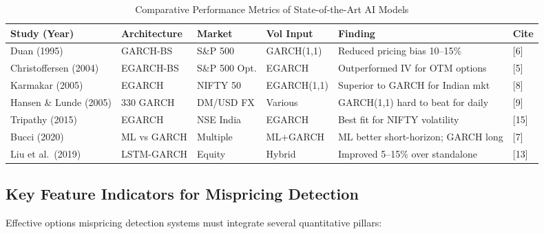 \documentclass[12pt,a4paper]{article}
\begin{document}
\begin{table}[H]
\centering
\caption{Comparative Performance Metrics of State-of-the-Art AI Models}
\label{tab:model_comparison}
\small
\begin{tabularx}{\textwidth}{l l l l X l}
\toprule
\textbf{Study (Year)} & \textbf{Architecture} & \textbf{Market} & \textbf{Vol Input} & \textbf{Finding} & \textbf{Cite} \\
\midrule
Duan (1995) & GARCH-BS & S\&P 500 & GARCH(1,1) & Reduced pricing bias 10--15\% & [6] \\
Christoffersen (2004) & EGARCH-BS & S\&P 500 Opt. & EGARCH & Outperformed IV for OTM options & [5] \\
Karmakar (2005) & EGARCH & NIFTY 50 & EGARCH(1,1) & Superior to GARCH for Indian mkt & [8] \\
Hansen \& Lunde (2005) & 330 GARCH & DM/USD FX & Various & GARCH(1,1) hard to beat for daily & [9] \\
Tripathy (2015) & EGARCH & NSE India & EGARCH & Best fit for NIFTY volatility & [15] \\
Bucci (2020) & ML vs GARCH & Multiple & ML+GARCH & ML better short-horizon; GARCH long & [7] \\
Liu et al.\ (2019) & LSTM-GARCH & Equity & Hybrid & Improved 5--15\% over standalone & [13] \\
\bottomrule
\end{tabularx}
\end{table}

\subsection{Key Feature Indicators for Mispricing Detection}

Effective options mispricing detection systems must integrate several quantitative pillars:
\end{document}
